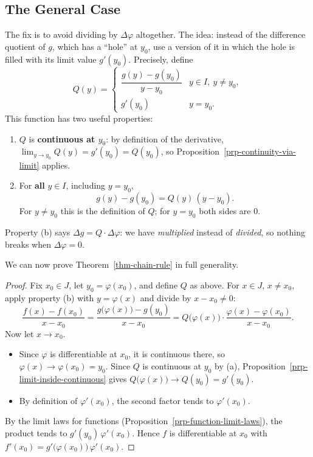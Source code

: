 \documentclass[
  letterpaper,
  DIV=11,
  numbers=noendperiod]{scrreprt}
\providecommand{\tightlist}{%
  \setlength{\itemsep}{0pt}\setlength{\parskip}{0pt}}
\theoremstyle{plain}
\theoremstyle{plain}
\theoremstyle{definition}
\theoremstyle{definition}
\theoremstyle{definition}
\theoremstyle{plain}
\theoremstyle{plain}
\theoremstyle{remark}
\begin{document}
\subsection{The General Case}\label{the-general-case}

The fix is to avoid dividing by \(\Delta\varphi\) altogether. The idea:
instead of the difference quotient of \(g\), which has a ``hole'' at
\(y_0\), use a version of it in which the hole is filled with its limit
value \(g'(y_0)\). Precisely, define \[
Q(y) = \begin{cases}
\dfrac{g(y)-g(y_0)}{y-y_0} & y\in I,\ y\neq y_0,\\[8pt]
g'(y_0) & y = y_0 .
\end{cases}
\] This function has two useful properties:

\begin{enumerate}
\def\labelenumi{(\alph{enumi})}
\item
  \(Q\) is \textbf{continuous at \(y_0\)}: by definition of the
  derivative, \(\lim_{y\to y_0}Q(y) = g'(y_0) = Q(y_0)\), so
  Proposition~\ref{prp-continuity-via-limit} applies.
\item
  For \textbf{all} \(y\in I\), including \(y=y_0\), \[
  g(y)-g(y_0) = Q(y)\,(y-y_0).
  \] For \(y\neq y_0\) this is the definition of \(Q\); for \(y=y_0\)
  both sides are \(0\).
\end{enumerate}

Property (b) says \(\Delta g = Q\cdot\Delta\varphi\): we have
\emph{multiplied} instead of \emph{divided}, so nothing breaks when
\(\Delta\varphi=0\).

We can now prove Theorem~\ref{thm-chain-rule} in full generality.

\begin{proof}
Fix \(x_0\in J\), let \(y_0=\varphi(x_0)\), and define \(Q\) as above.
For \(x\in J\), \(x\neq x_0\), apply property (b) with
\(y = \varphi(x)\) and divide by \(x-x_0\neq0\): \[
\frac{f(x)-f(x_0)}{x-x_0} = \frac{g\big(\varphi(x)\big)-g(y_0)}{x-x_0}
= Q\big(\varphi(x)\big)\cdot\frac{\varphi(x)-\varphi(x_0)}{x-x_0}.
\] Now let \(x\to x_0\).

\begin{itemize}
\tightlist
\item
  Since \(\varphi\) is differentiable at \(x_0\), it is continuous
  there, so \(\varphi(x)\to\varphi(x_0)=y_0\). Since \(Q\) is continuous
  at \(y_0\) by (a), Proposition~\ref{prp-limit-inside-continuous} gives
  \(Q\big(\varphi(x)\big)\to Q(y_0) = g'(y_0)\).
\item
  By definition of \(\varphi'(x_0)\), the second factor tends to
  \(\varphi'(x_0)\).
\end{itemize}

By the limit laws for functions
(Proposition~\ref{prp-function-limit-laws}), the product tends to
\(g'(y_0)\,\varphi'(x_0)\). Hence \(f\) is differentiable at \(x_0\)
with \(f'(x_0)=g'\big(\varphi(x_0)\big)\,\varphi'(x_0)\).
\end{proof}
\end{document}
